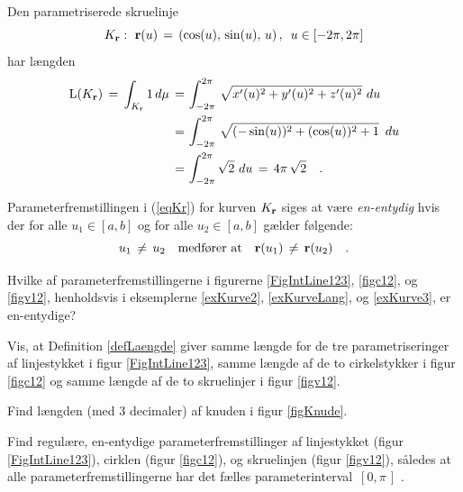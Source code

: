 \begin{example}\label{exKurve3}
Den parametriserede skruelinje
$$K_{\bf r}: \,\, {\bf
r}(u) \, = \, \left(\cos(u), \,\sin(u),\, u\right), \, \, \, u \in
[-2\pi, 2\pi]
$$ har længden
$$
\begin{aligned}
\operatorname{L}(K_{\bf r}) \, = \, \int_{K_{\bf r}} 1 \, d\mu \, = \,
&\int_{-2\pi}^{2\pi} \,\sqrt{x'(u)^{2} + y'(u)^{2} + z'(u)^{2}}\,\,du \\
\, = \, &\int_{-2\pi}^{2\pi}\,\sqrt{(-\sin(u))^{2} +
(\cos(u))^{2} + 1}\,\,\,du \\
  \, = \, &\int_{-2\pi}^{2\pi} \sqrt{2}\,\,du
  \, =
\, 4\pi\,\sqrt{2} \quad.
\end{aligned}
$$
\end{example}



\begin{definition} \label{defEnEntydigKurve}
Parameterfremstillingen i (\ref{eqKr}) for kurven $K_{\bf r}$ siges
at være {\em{{en-entydig}}} hvis der for alle $u_{1} \in [a, b]$ og
for alle $u_{2} \in [a, b]$ gælder følgende:
\begin{equation}
u_{1} \, \neq \, u_{2} \quad \text{medfører at} \quad {\bf r}(u_{1}) \, \neq \, {\bf r}(u_{2}) \quad .
\end{equation}
\end{definition}

\begin{exercise}
Hvilke af parameterfremstillingerne i figurerne \ref{FigIntLine123},
\ref{figc12}, og \ref{figv12}, henholdsvis i eksemplerne
\ref{exKurve2}, \ref{exKurveLang}, og \ref{exKurve3}, er
en-entydige?
\end{exercise}


\begin{exercise}
\label{exercLaengde} Vis, at Definition \ref{defLaengde} giver samme
længde for de tre parametriseringer af linje\-styk\-ket i figur
\ref{FigIntLine123}, samme længde af de to cirkelstykker i figur
\ref{figc12} og samme længde af de to skruelinjer i figur
\ref{figv12}.
\end{exercise}

\begin{exercise}
Find længden (med 3 decimaler) af knuden i figur \ref{figKnude}.
\end{exercise}



\begin{exercise}
Find regulære, en-entydige parameterfremstillinger af linjestykket
(figur \ref{FigIntLine123}), cirklen (figur \ref{figc12}), og
skruelinjen (figur \ref{figv12}), således at alle parameterfremstillingerne har
det fælles parameterinterval $\,[0, \pi\,] $ .
\end{exercise}

